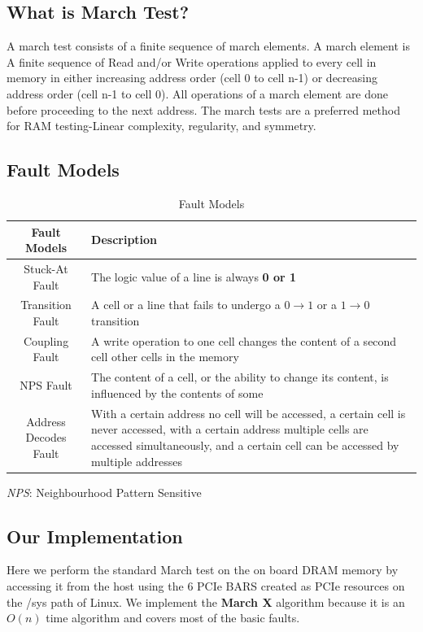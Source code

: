\subsection{What is March Test?}

A march test consists of a finite sequence of march elements. A march element is A finite sequence of Read and/or Write operations applied
to every cell in memory in either increasing address order (cell 0 to cell n-1) or decreasing address order (cell n-1 to cell 0). All
operations of a march element are done before proceeding to the next address. The march tests are a preferred method for RAM testing-Linear
complexity, regularity, and symmetry.

\subsection{Fault Models}
\begin{table}[H]
\begin{tabular}{c | m{}}
\hline
Fault Models & Description \\
\hline
Stuck-At Fault & The logic value of a line is always \textbf{0 or 1}\\
Transition Fault & A cell or a line that fails to undergo a $0 \rightarrow 1$ or a $1 \rightarrow 0$ transition \\
Coupling Fault & A write operation to one cell changes the content of a second cell other cells in the memory \\
NPS Fault & The content of a cell, or the ability to change its content, is influenced by the contents of some\\
Address Decodes Fault & With a certain address no cell will be accessed, a certain cell is never accessed, with a certain address multiple
cells are accessed simultaneously, and a certain cell can be accessed by multiple addresses
\end{tabular}
\caption{Fault Models}
\end{table}

\textit{NPS}: Neighbourhood Pattern Sensitive

\subsection{Our Implementation}
Here we perform the standard March test on the on board DRAM memory by accessing it from the host using the 6 PCIe BARS created as PCIe
resources on the /sys path of Linux. We implement the \textbf{March X} algorithm because it
is an $O(n)$ time algorithm and covers most of the basic faults.

